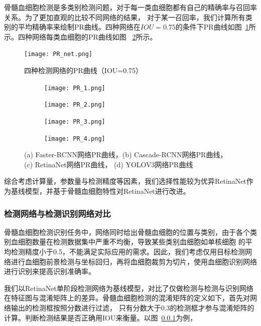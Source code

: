 骨髓血细胞检测是多类别检测问题，对于每一类血细胞都有自己的精确率与召回率关系。为了更加直观的比较不同网络的结果，
对于某一召回率，我们计算所有类别的平均精确率来绘制PR曲线。四种网络在$IOU=0.75$的条件下PR曲线如图~\ref{fig:pr_net}所示。四种网络每类血细胞的PR曲线如图
~\ref{fig:pr_curve}所示。

\begin{figure}                     
  \centering                      
  \texttt{[image: PR\_net.png]}                      
  \caption{四种检测网络的PR曲线（IOU=0.75）}                      
  \label{fig:pr_net}       
\end{figure}   

\begin{figure}[htbp]
	\centering
	\begin{subfigure}{0.45\linewidth}
		\centering
		\texttt{[image: PR\_1.png]}
    \caption{}
	\end{subfigure}
	\centering
	\begin{subfigure}{0.45\linewidth}
		\centering
		\texttt{[image: PR\_2.png]}
    \caption{}
	\end{subfigure}
  
	\centering
	\begin{subfigure}{0.45\linewidth}
		\centering
		\texttt{[image: PR\_3.png]}
    \caption{}
	\end{subfigure}
	\centering
	\begin{subfigure}{0.45\linewidth}
		\centering
		\texttt{[image: PR\_4.png]}
    \caption{}
	\end{subfigure}
	\caption{(a) Faster-RCNN网络PR曲线，(b)  Cascade-RCNN网络PR曲线， (c) RetinaNet网络PR曲线， (d) YOLOV3网络PR曲线}
	\label{fig:pr_curve}
\end{figure}

综合考虑计算量，参数量与检测精度等因素，我们选择性能较为优异RetinaNet作为基线模型，并基于骨髓血细胞特性对RetinaNet进行改进。

\subsubsection{检测网络与检测识别网络对比}

  骨髓血细胞检测识别任务中，网络同时给出骨髓血细胞的位置与类别，由于各个类别血细胞数量在检测数据集中严重不均衡，导致某些类别血细胞如单核细胞
的平均检测精度小于0.5，不能满足实际应用的需求。因此，我们考虑仅用目标检测网络进行血细胞前景检测与坐标回归，再将血细胞裁剪为切片，使用血细胞识别网络
进行识别来提高识别准确率。
  
我们以RetinaNet单阶段检测网络为基线模型，对比了仅做检测与检测与识别网络在特征图与混淆矩阵上的差异。骨髓血细胞检测的混淆矩阵的定义如下，首先对网络输出的检测框按照分数进行过滤，
只有分数大于0.3的检测框才参与混淆矩阵的计算。判断检测结果是否正确用IOU来衡量。以图~\ref{}为例，





